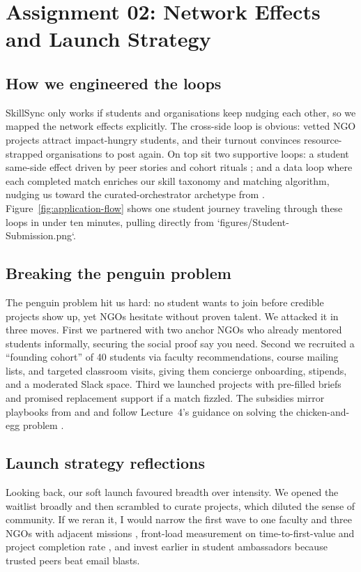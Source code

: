 \section*{Assignment 02: Network Effects and Launch Strategy}

\subsection*{How we engineered the loops}
SkillSync only works if students and organisations keep nudging each other, so we mapped the network effects explicitly. The cross-side loop is obvious: vetted NGO projects attract impact-hungry students, and their turnout convinces resource-strapped organisations to post again. On top sit two supportive loops: a student same-side effect driven by peer stories and cohort rituals \citep{Choudary2016}; and a data loop where each completed match enriches our skill taxonomy and matching algorithm, nudging us toward the curated-orchestrator archetype from \citet{Reillier2017}. Figure~\ref{fig:application-flow} shows one student journey traveling through these loops in under ten minutes, pulling directly from `figures/Student-Submission.png`.

\subsection*{Breaking the penguin problem}
The penguin problem hit us hard: no student wants to join before credible projects show up, yet NGOs hesitate without proven talent. We attacked it in three moves. First we partnered with two anchor NGOs who already mentored students informally, securing the social proof \citet{HagiuWright2013} say you need. Second we recruited a ``founding cohort'' of 40 students via faculty recommendations, course mailing lists, and targeted classroom visits, giving them concierge onboarding, stipends, and a moderated Slack space. Third we launched projects with pre-filled briefs and promised replacement support if a match fizzled. The subsidies mirror playbooks from \citet{Gunasilan2024} and \citet{FarrellSaloner1986} and follow Lecture~4's guidance on solving the chicken-and-egg problem \citep{Lecture04}.

\subsection*{Launch strategy reflections}
Looking back, our soft launch favoured breadth over intensity. We opened the waitlist broadly and then scrambled to curate projects, which diluted the sense of community. If we reran it, I would narrow the first wave to one faculty and three NGOs with adjacent missions \citep{Choudary2016}, front-load measurement on time-to-first-value and project completion rate \citep{ShapiroVarian1999}, and invest earlier in student ambassadors because trusted peers beat email blasts.

